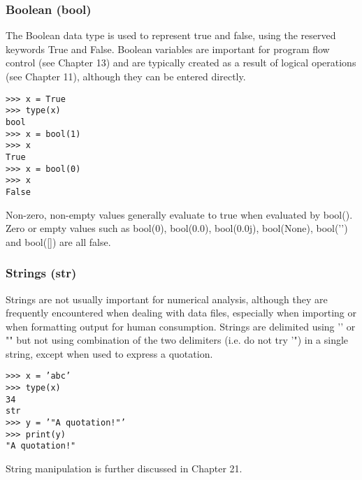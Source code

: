 \documentclass[11pt]{article} %
\begin{document}
\subsubsection{Boolean (bool)}
The Boolean data type is used to represent true and false, using the reserved keywords True and False.
Boolean variables are important for program flow control (see Chapter 13) and are typically created as a
result of logical operations (see Chapter 11), although they can be entered directly.
\begin{framed}
\begin{verbatim}
>>> x = True
>>> type(x)
bool
>>> x = bool(1)
>>> x
True
>>> x = bool(0)
>>> x
False
\end{verbatim}
\end{framed}
Non-zero, non-empty values generally evaluate to true when evaluated by bool(). Zero or empty values
such as bool(0), bool(0.0), bool(0.0j), bool(None), bool(’’) and bool([]) are all false.
\subsubsection{Strings (str)}
Strings are not usually important for numerical analysis, although they are frequently encountered when
dealing with data files, especially when importing or when formatting output for human consumption.
Strings are delimited using ’’ or "" but not using combination of the two delimiters (i.e. do not try ’") in
a single string, except when used to express a quotation.
\begin{framed}
\begin{verbatim}
>>> x = ’abc’
>>> type(x)
34
str
>>> y = ’"A quotation!"’
>>> print(y)
"A quotation!"
\end{verbatim}
\end{framed}
String manipulation is further discussed in Chapter 21.

\newpage
\end{document}
